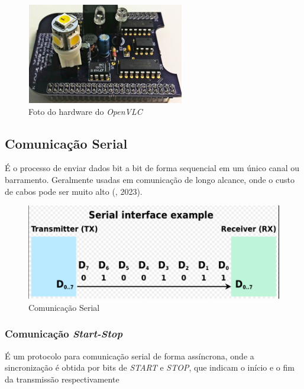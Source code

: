 \begin{figure}[!htbp]
    \caption{Foto do hardware do \textit{OpenVLC}} \label{fig_minipage_imagem1}
    \includegraphics[scale=0.9]{images/Cape.png}
\end{figure}

\newpage

\subsection{Comunicação Serial}

É o processo de enviar dados bit a bit de forma sequencial em um único canal ou barramento. Geralmente usadas em comunicação de longo alcance, onde o custo de cabos pode ser muito alto (\textit{\citeauthor{wikipedia2023}}, 2023).

\begin{figure}[!htbp]
    \caption{Comunicação Serial} \label{comunicacao_serial}
    \includegraphics[scale=0.4]{images/comunicacao_serial.png}
\end{figure}

\subsubsection{Comunicação \textit{Start-Stop}}

É um protocolo para comunicação serial de forma assíncrona, onde a sincronização é obtida por bits de \emph{START} e \emph{STOP}, que indicam o início e o fim da transmissão respectivamente \cite{comunicaoSerial}

